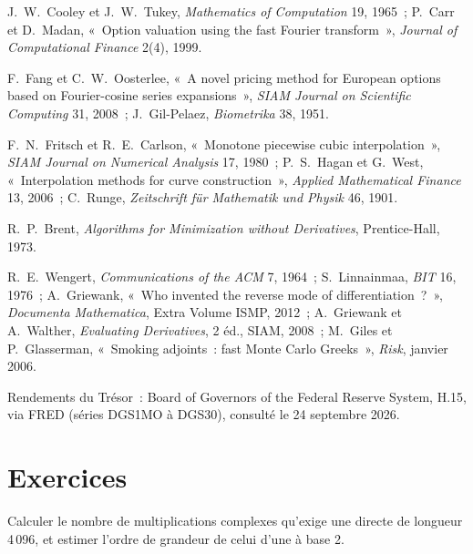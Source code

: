 \begin{omsources}
\item J.~W.~Cooley et J.~W.~Tukey, \emph{Mathematics of Computation} 19, 1965~; P.~Carr et D.~Madan, «~Option valuation using the fast Fourier transform~», \emph{Journal of Computational Finance} 2(4), 1999.
\item F.~Fang et C.~W.~Oosterlee, «~A novel pricing method for European options based on Fourier-cosine series expansions~», \emph{SIAM Journal on Scientific Computing} 31, 2008~; J.~Gil-Pelaez, \emph{Biometrika} 38, 1951.
\item F.~N.~Fritsch et R.~E.~Carlson, «~Monotone piecewise cubic interpolation~», \emph{SIAM Journal on Numerical Analysis} 17, 1980~; P.~S.~Hagan et G.~West, «~Interpolation methods for curve construction~»,
\emph{Applied Mathematical Finance} 13, 2006~; C.~Runge, \emph{Zeitschrift für Mathematik und Physik} 46, 1901.
\item R.~P.~Brent, \emph{Algorithms for Minimization without Derivatives}, Prentice-Hall, 1973.
\item R.~E.~Wengert, \emph{Communications of the ACM} 7, 1964~; S.~Linnainmaa, \emph{BIT} 16, 1976~; A.~Griewank, «~Who invented the reverse mode of differentiation~?~», \emph{Documenta Mathematica}, Extra Volume ISMP, 2012~; A.~Griewank et A.~Walther, \emph{Evaluating Derivatives}, 2 éd., SIAM, 2008~; M.~Giles et P.~Glasserman,
«~Smoking adjoints~: fast Monte Carlo Greeks~», \emph{Risk}, janvier 2006.
\item Rendements du Trésor~: Board of Governors of the Federal Reserve System, H.15, via FRED (séries DGS1MO à DGS30), consulté le 24 septembre 2026.
\end{omsources}

\section{Exercices}

\begin{exercise}[$\star$]\label{exo:qm:transforms-interpolation-and-algorithmic-differentiation:1}
Calculer le nombre de multiplications complexes qu'exige une  directe de longueur 4\,096, et estimer l'ordre de grandeur de celui d'une  à base 2.
\end{exercise}

